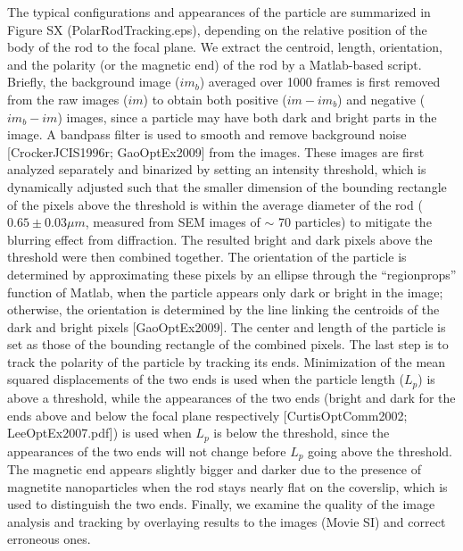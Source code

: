 \documentclass[aps,prl, twocolumn,groupedaddress]{revtex4}
\begin{document}
The typical configurations and appearances of the particle are summarized in Figure SX (PolarRodTracking.eps), depending on the relative position of the body of the rod to the focal plane. We extract the centroid,  length, orientation, and the polarity (or the magnetic end) of the rod by a  Matlab-based script. Briefly, the background image ($im_b$) averaged over 1000 frames is first removed from the raw images ($im$) to obtain both positive ($im-im_b$) and negative ($im_b-im$) images, since a particle may have both dark and bright parts in the image. A bandpass filter is used to smooth and remove background noise [CrockerJCIS1996r; GaoOptEx2009] from the  images. These images are first analyzed separately and binarized by setting an intensity threshold, which is dynamically adjusted such that the smaller dimension of the bounding rectangle of the pixels above the threshold is within the average diameter of the rod ($0.65\pm 0.03 \mu m$, measured from SEM images of $\sim$ 70 particles) to mitigate the blurring effect from diffraction. The resulted bright and dark pixels above the threshold were then combined together. The orientation of the particle is determined by approximating these pixels by an ellipse through the ``regionprops'' function of Matlab, when the particle appears only dark or bright in the image; otherwise, the orientation is determined by the line linking the centroids of the dark and bright pixels [GaoOptEx2009]. The center and length of the particle is set as those of the bounding rectangle of the combined pixels. The last step is to track the polarity of the particle by tracking its ends. Minimization of the mean squared displacements of the two ends is used when the particle length ($L_p$) is above a threshold, while the appearances of the two ends (bright and dark for the ends above and below the focal plane respectively [CurtisOptComm2002; LeeOptEx2007.pdf]) is used when $L_p$ is below the threshold, since the appearances of the two ends will not change before $L_p$  going above the  threshold. The magnetic end appears slightly bigger and darker due to the presence of magnetite nanoparticles when the rod stays nearly flat on the coverslip, which is used to distinguish the two ends. Finally, we examine the quality of the image analysis and tracking by overlaying results to the images (Movie SI) and correct erroneous ones. 
\end{document}
